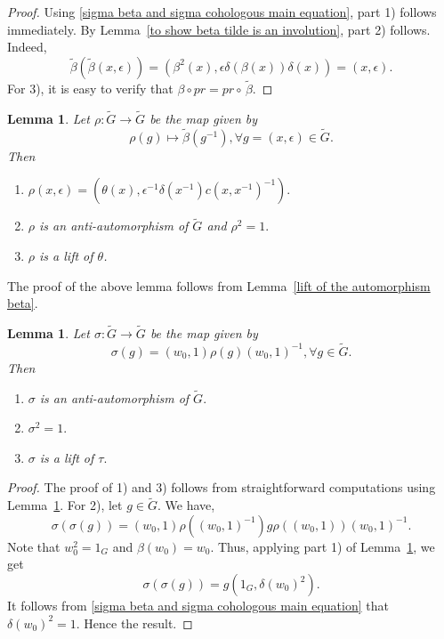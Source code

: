 \documentclass[11pt, a4paper, reqno]{amsart}
\newtheorem{lemma}[theorem]{Lemma}
\theoremstyle{definition}
\theoremstyle{remark}
\theoremstyle{example}
\theoremstyle{note}
\numberwithin{equation}{section}
\begin{document}
\begin{proof} Using \eqref{sigma beta and sigma cohologous main equation}, part 1) follows immediately. By Lemma~\ref{to show beta tilde is an involution}, part 2) follows. Indeed,
$$\tilde{\beta}(\tilde{\beta}(x, \epsilon)) = (\beta^2(x), \epsilon \delta(\beta(x)) \delta(x)) = (x, \epsilon).$$
For 3), it is easy to verify that $\beta \circ pr = pr \circ\, \tilde{\beta}.$
\end{proof}

\begin{lemma}\label{definition of the involution rho} Let $\rho: \widetilde{G} \to \widetilde{G}$ be the map given by \[\rho(g) \mapsto \tilde{\beta}(g^{-1}), \forall g=(x, \epsilon)\in \widetilde{G}.\] Then
\begin{enumerate}[label=\emph{\arabic*)}]
 \item $\rho(x , \epsilon) = (\theta(x), \epsilon^{-1} \delta(x^{-1}) c(x, x^{-1})^{-1}).$
 \vspace{0.1 cm}
    \item $\rho$ is an anti-automorphism of $\widetilde{G}$ and $\rho^{2}=1.$ 
\vspace{0.1 cm}
    \item $\rho$ is a lift of  $\theta$.
\end{enumerate}
\end{lemma}
The proof of the above lemma follows from Lemma~\ref{lift of the automorphism beta}.


\begin{lemma}\label{definition of the involution sigma} Let $\sigma: \widetilde{G} \to \widetilde{G}$ be the map given by 
\[\sigma(g)=(w_{0},1) \rho(g) (w_{0},1)^{-1}, \forall g\in \widetilde{G}.\]
Then
\begin{enumerate}[label=\emph{\arabic*)}]
\item $\sigma$ is an anti-automorphism of $\widetilde{G}.$
\vspace{0.1 cm}
\item $\sigma^2 =1.$ 
\vspace{0.1 cm}
\item $\sigma$ is a lift of $\tau.$
\end{enumerate}
\end{lemma}

\begin{proof} The proof of 1) and 3) follows from straightforward computations using Lemma~\ref{definition of the involution rho}. For 2), let $g \in \widetilde{G}.$ We have, 
\begin{equation*}\label{sigma is an involution 1}
\sigma(\sigma(g)) = (w_0,1) \rho((w_0, 1)^{-1}) g \rho((w_0, 1)) (w_0, 1)^{-1}.
\end{equation*}
Note that $w_{0}^{2} = 1_{G}$ and $\beta(w_{0}) = w_{0}$. Thus, applying part 1) of Lemma~\ref{definition of the involution rho}, we get
$$\sigma(\sigma(g)) = g (1_{G}, \delta(w_{0})^{2}).$$
It follows from \eqref{sigma beta and sigma cohologous main equation}  that $\delta(w_{0})^{2} =1.$ Hence the result. 
\end{proof}
\end{document}
